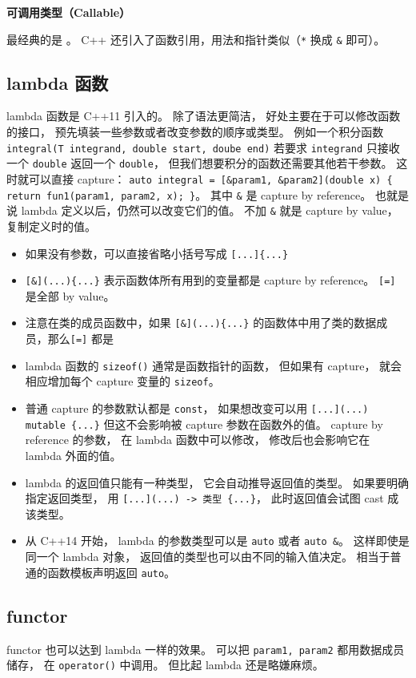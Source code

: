 

\textbf{可调用类型（Callable）}

最经典的是 。 C++ 还引入了函数引用，用法和指针类似（\verb`*` 换成 \verb`&` 即可）。

\subsection{lambda 函数}
lambda 函数是 C++11 引入的。 除了语法更简洁， 好处主要在于可以修改函数的接口， 预先填装一些参数或者改变参数的顺序或类型。 例如一个积分函数 \verb`integral(T integrand, double start, doube end)` 若要求 \verb`integrand` 只接收一个 \verb`double` 返回一个 \verb`double`， 但我们想要积分的函数还需要其他若干参数。 这时就可以直接 capture： \verb`auto integral = [&param1, &param2](double x) { return fun1(param1, param2, x); }`。 其中 \verb`&` 是 capture by reference。 也就是说 lambda 定义以后，仍然可以改变它们的值。 不加 \verb`&` 就是 capture by value， 复制定义时的值。

\begin{itemize}
\item 如果没有参数，可以直接省略小括号写成 \verb`[...]{...}`
\item \verb`[&](...){...}` 表示函数体所有用到的变量都是 capture by reference。 \verb`[=]` 是全部 by value。
\item 注意在类的成员函数中，如果 \verb`[&](...){...}` 的函数体中用了类的数据成员，那么\verb`[=]` 都是
\item lambda 函数的 \verb`sizeof()` 通常是函数指针的函数， 但如果有 capture， 就会相应增加每个 capture 变量的 \verb`sizeof`。
\item 普通 capture 的参数默认都是 \verb`const`， 如果想改变可以用 \verb`[...](...) mutable {...}` 但这不会影响被 capture 参数在函数外的值。 capture by reference 的参数， 在 lambda 函数中可以修改， 修改后也会影响它在 lambda 外面的值。
\item lambda 的返回值只能有一种类型， 它会自动推导返回值的类型。 如果要明确指定返回类型， 用 \verb`[...](...) -> 类型 {...}`， 此时返回值会试图 cast 成该类型。
\item 从 C++14 开始， lambda 的参数类型可以是 \verb`auto` 或者 \verb`auto &`。 这样即使是同一个 lambda 对象， 返回值的类型也可以由不同的输入值决定。 相当于普通的函数模板声明返回 \verb`auto`。
\end{itemize}

\subsection{functor}
functor 也可以达到 lambda 一样的效果。 可以把 \verb`param1, param2` 都用数据成员储存， 在 \verb`operator()` 中调用。 但比起 lambda 还是略嫌麻烦。

